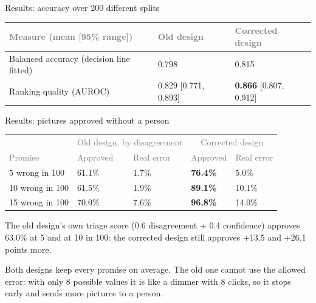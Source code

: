 \documentclass[aspectratio=169,11pt]{beamer}
\newcommand{\h}[1]{\textcolor{grey}{#1}}
\newcommand{\remark}[1]{\par\vspace{0.35cm}{\small\textcolor{grey}{#1}}}
\begin{document}
\begin{frame}{Results: accuracy over 200 different splits}
\begin{tabular}{@{}L{4.6cm} C{3.8cm} C{3.8cm}@{}}
\toprule
\h{Measure (mean [95\% range])} & \h{Old design} & \h{Corrected design}\\
\midrule
Balanced accuracy (decision line fitted) & 0.798 & 0.815\\
Ranking quality (AUROC) & 0.829 [0.771, 0.893] & \textbf{0.866} [0.807, 0.912]\\
\bottomrule
\end{tabular}



\vspace{-0.3cm}
\remark{The corrected design calls almost every picture a scene at its 0.5 line, so its lower error rate is no gain. With a fitted line both decide equally well.}
\end{frame}

\begin{frame}{Results: pictures approved without a person}
\begin{tabular}{@{}L{3.0cm} C{2.4cm} C{2.1cm} C{2.4cm} C{2.1cm}@{}}
\toprule
 & \multicolumn{2}{c}{\h{Old design, by disagreement}} & \multicolumn{2}{c}{\h{Corrected design}}\\
\h{Promise} & \h{Approved} & \h{Real error} & \h{Approved} & \h{Real error}\\
 wrong in 100 & 61.1\% & 1.7\% & \textbf{76.4\%} & 5.0\%\\
10 wrong in 100 & 61.5\% & 1.9\% & \textbf{89.1\%} & 10.1\%\\
15 wrong in 100 & 70.0\% & 7.6\% & \textbf{96.8\%} & 14.0\%\\
\bottomrule
\end{tabular}

\vspace{0.2cm}
\footnotesize The old design's own triage score (0.6 disagreement + 0.4 confidence) approves 63.0\% at 5 and at 10 in 100: the corrected design still approves +13.5 and +26.1 points more.

\vspace{0.4cm}
Both designs keep every promise on average. The old one cannot use the allowed error: with only 8 possible values it is like a dimmer with 8 clicks, so it stops early and sends more pictures to a person.
\end{frame}
\end{document}
